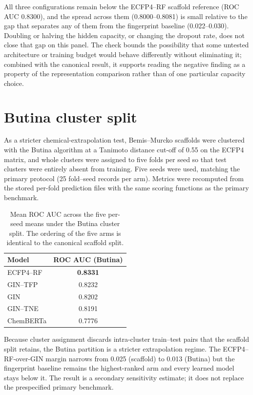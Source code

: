 \documentclass[11pt,a4paper]{article}
\begin{document}
All three configurations remain below the ECFP4--RF \citep{ecfp_2010} scaffold reference (ROC AUC \num{0.8300}), and the spread across them (\num{0.8000}--\num{0.8081}) is small relative to the gap that separates any of them from the fingerprint baseline (\num{0.022}--\num{0.030}). Doubling or halving the hidden capacity, or changing the dropout rate, does not close that gap on this panel. The check bounds the possibility that some untested architecture or training budget would behave differently without eliminating it; combined with the canonical result, it supports reading the negative finding as a property of the representation comparison rather than of one particular capacity choice.

\section{Butina cluster split}
\label{sec:butina_si}

As a stricter chemical-extrapolation test, Bemis--Murcko scaffolds \citep{bemis_murcko_1996} were clustered with the Butina algorithm \citep{butina1999} at a Tanimoto distance cut-off of \num{0.55} on the ECFP4 matrix, and whole clusters were assigned to five folds per seed so that test clusters were entirely absent from training. Five seeds were used, matching the primary protocol (\num{25} fold--seed records per arm). Metrics were recomputed from the stored per-fold prediction files with the same scoring functions as the primary benchmark.

\begin{table}[h]
\centering
\caption{Mean ROC AUC across the five per-seed means under the Butina cluster split. The ordering of the five arms is identical to the canonical scaffold split.}
\label{tab:s5_butina}
\begin{tabular}{lc}
\toprule
Model & ROC AUC (Butina) \\
\midrule
ECFP4--RF & \textbf{\num{0.8331}} \\
GIN--TFP & \num{0.8232} \\
GIN & \num{0.8202} \\
GIN--TNE & \num{0.8191} \\
ChemBERTa & \num{0.7776} \\
\bottomrule
\end{tabular}
\end{table}

Because cluster assignment discards intra-cluster train--test pairs that the scaffold split retains, the Butina partition is a stricter extrapolation regime. The ECFP4--RF-over-GIN margin narrows from \num{0.025} (scaffold) to \num{0.013} (Butina) but the fingerprint baseline remains the highest-ranked arm and every learned model stays below it. The result is a secondary sensitivity estimate; it does not replace the prespecified primary benchmark.
\end{document}
